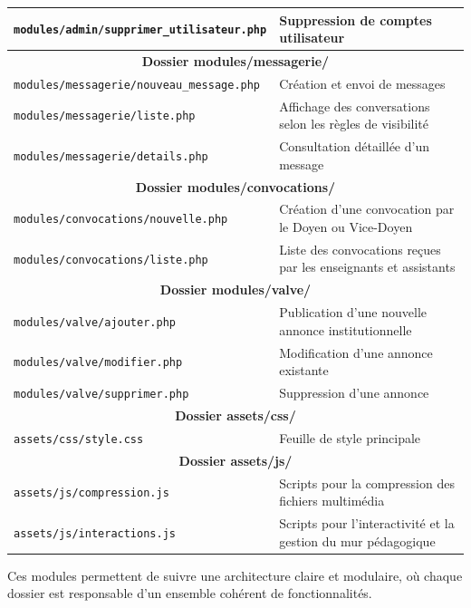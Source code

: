 \documentclass[12pt,a4paper]{article}
\begin{document}
\begin{table}[h]
\begin{tabular}{|l|p{8cm}|}
\hline
\texttt{modules/admin/supprimer\_utilisateur.php} & Suppression de comptes utilisateur \\
\hline
\multicolumn{2}{|c|}{\textbf{Dossier modules/messagerie/}} \\
\hline
\texttt{modules/messagerie/nouveau\_message.php} & Création et envoi de messages \\
\hline
\texttt{modules/messagerie/liste.php} & Affichage des conversations selon les règles de visibilité \\
\hline
\texttt{modules/messagerie/details.php} & Consultation détaillée d’un message \\
\hline
\multicolumn{2}{|c|}{\textbf{Dossier modules/convocations/}} \\
\hline
\texttt{modules/convocations/nouvelle.php} & Création d’une convocation par le Doyen ou Vice-Doyen \\
\hline
\texttt{modules/convocations/liste.php} & Liste des convocations reçues par les enseignants et assistants \\
\hline
\multicolumn{2}{|c|}{\textbf{Dossier modules/valve/}} \\
\hline
\texttt{modules/valve/ajouter.php} & Publication d’une nouvelle annonce institutionnelle \\
\hline
\texttt{modules/valve/modifier.php} & Modification d’une annonce existante \\
\hline
\texttt{modules/valve/supprimer.php} & Suppression d’une annonce \\
\hline
\multicolumn{2}{|c|}{\textbf{Dossier assets/css/}} \\
\hline
\texttt{assets/css/style.css} & Feuille de style principale \\
\hline
\multicolumn{2}{|c|}{\textbf{Dossier assets/js/}} \\
\hline
\texttt{assets/js/compression.js} & Scripts pour la compression des fichiers multimédia \\
\hline
\texttt{assets/js/interactions.js} & Scripts pour l’interactivité et la gestion du mur pédagogique \\
\hline
\end{tabular}
\end{table}

Ces modules permettent de suivre une architecture claire et modulaire, où chaque dossier est responsable d'un ensemble cohérent de fonctionnalités.
\end{document}
